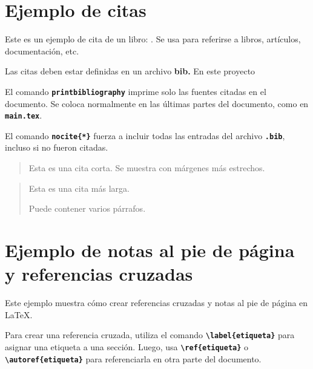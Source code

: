     \clearpage
 \section{Ejemplo de citas}
 

 Este es un ejemplo de cita de un libro: \cite{EjemploLibro}.  
 Se usa para referirse a libros, artículos, documentación, etc.
 
 Las citas deben estar definidas en un archivo \textbf{bib.}  
 En este proyecto
 
 El comando \texttt{\textbf{printbibliography}} imprime solo las fuentes citadas en el documento.  
Se coloca normalmente en las últimas partes del documento, como en \texttt{\textbf{main.tex}}.

El comando \texttt{\textbf{nocite\{*\}}} fuerza a incluir todas las entradas del archivo \texttt{\textbf{.bib}}, incluso si no fueron citadas.
 \begin{quote}
 Esta es una cita corta. Se muestra con márgenes más estrechos.
 \end{quote}
 
 \begin{quotation}
 Esta es una cita más larga.
 
 Puede contener varios párrafos.
 \end{quotation}
 \clearpage
 
 \section{Ejemplo de notas al pie de página y referencias cruzadas}

 Este ejemplo muestra cómo crear referencias cruzadas y notas al pie de página en \LaTeX.
 
 Para crear una referencia cruzada, utiliza el comando \textbf{\texttt{\textbackslash label\{etiqueta\}}}
 para asignar una etiqueta a una sección. Luego, usa \textbf{\texttt{\textbackslash ref\{etiqueta\}}} o 
 \textbf{\texttt{\textbackslash autoref\{etiqueta\}}} para referenciarla en otra parte del documento.
 
